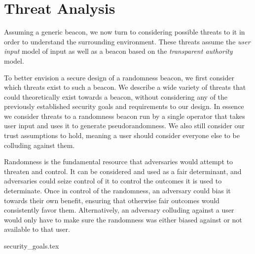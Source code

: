 \section{Threat Analysis}
Assuming a generic beacon, we now turn to considering possible threats to it in order to understand the surrounding environment. These threats assume the \emph{user input} model of input as well as a beacon based on the \emph{transparent authority} model.


To better envision a secure design of a randomness beacon, we first consider which threats exist to such a beacon. We describe a wide variety of threats that could theoretically exist towards a beacon, without considering any of the previously established security goals and requirements to our design. In essence we consider threats to a randomness beacon run by a single operator that takes user input and uses it to generate pseudorandomness. We also still consider our trust assumptions to hold, meaning a user should consider everyone else to be colluding against them.

Randomness is the fundamental resource that adversaries would attempt to threaten and control. It can be considered and used as a fair determinant, and adversaries could seize control of it to control the outcomes it is used to determinate. Once in control of the randomness, an adversary could bias it towards their own benefit, ensuring that otherwise fair outcomes would consistently favor them. Alternatively, an adversary colluding against a user would only have to make sure the randomness was either biased against or not available to that user.

{security_goals.tex}